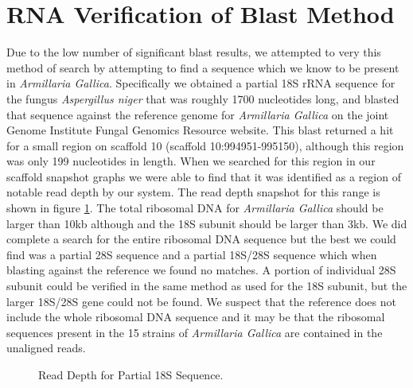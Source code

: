 \documentclass[12pt]{article}
\begin{document}
%
%
\section{RNA Verification of Blast Method}
	Due to the low number of significant blast results, we attempted to very this method of search by attempting to find a sequence which we know to be present in \textit{Armillaria Gallica}. Specifically we obtained a partial 18S rRNA sequence for the fungus \textit{Aspergillus niger} that was roughly 1700 nucleotides long, and blasted that sequence against the reference genome for \textit{Armillaria Gallica} on the joint Genome Institute Fungal Genomics Resource website. This blast returned a hit for a small region on scaffold 10 (scaffold 10:994951-995150), although this region was only 199 nucleotides in length. When we searched for this region in our scaffold snapshot graphs we were able to find that it was identified as a region of notable read depth by our system. The read depth snapshot for this range is shown in figure \ref{rdsnp18Srrna}. The total ribosomal DNA for \textit{Armillaria Gallica} should be larger than 10kb although and the 18S subunit should be larger than 3kb. We did complete a search for the entire ribosomal DNA sequence but the best we could find was a partial 28S sequence and a partial 18S/28S sequence which when blasting against the reference we found no matches. A portion of individual 28S subunit could be verified in the same method as used for the 18S subunit, but the larger 18S/28S gene could not be found. We suspect that the reference does not include the whole ribosomal DNA sequence and it may be that the ribosomal sequences present in the 15 strains of \textit{Armillaria Gallica} are contained in the unaligned reads. 
      \begin{figure}[H]
	\begin{centering}
 		\begin{singlespace}
			\vspace{-0.5cm}
			\caption[Read Depth for Partial 18S Sequence.]{Read Depth for Partial 18S Sequence.}\label{rdsnp18Srrna}
		\end{singlespace}
	\end{centering}
\end{figure}
%
%
\end{document}
